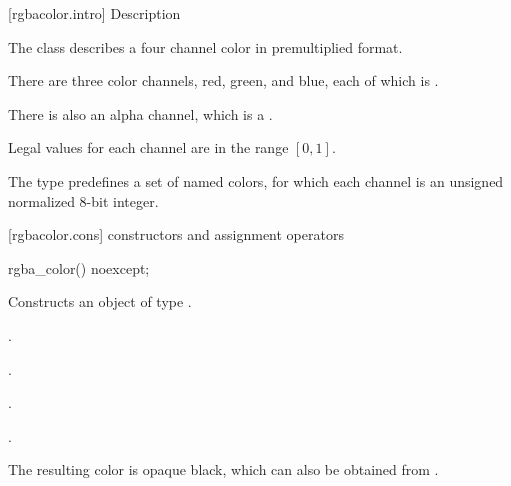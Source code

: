  [rgbacolor.intro] { Description}

\pnum
{}%
The class  describes a four channel color in premultiplied format.

\pnum
There are three color channels, red, green, and blue, each of which is .

\pnum
There is also an alpha channel, which is a .

\pnum
Legal values for each channel are in the range $[0, 1]$.

\pnum
The type predefines a set of named colors, for which each channel is an unsigned normalized 8-bit integer.

 [rgbacolor.cons] { constructors and assignment operators}

\begin{itemdecl}
	rgba_color() noexcept;
\end{itemdecl}
\begin{itemdescr}
	\pnum
	\effects
	Constructs an object of type .
	
	\pnum
	\postconditions
	.
	
	\pnum
	.
	
	\pnum
	.
	
	\pnum
	.
	
	\pnum
	\realnote
	The resulting color is opaque black, which can also be obtained from .
\end{itemdescr}

